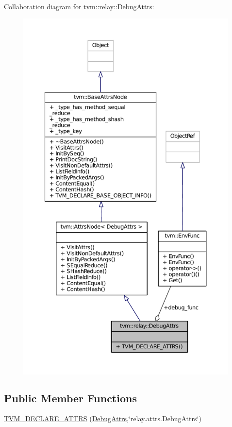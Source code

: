 Collaboration diagram for tvm\+:\+:relay\+:\+:Debug\+Attrs\+:
\nopagebreak
\begin{figure}[H]
\begin{center}
\leavevmode
\includegraphics[height=550pt]{structtvm_1_1relay_1_1DebugAttrs__coll__graph}
\end{center}
\end{figure}
\subsection*{Public Member Functions}
\begin{DoxyCompactItemize}
\item 
\hyperlink{structtvm_1_1relay_1_1DebugAttrs_ad9de58310cd2a2452f30b2e123cf56c8}{T\+V\+M\+\_\+\+D\+E\+C\+L\+A\+R\+E\+\_\+\+A\+T\+T\+RS} (\hyperlink{structtvm_1_1relay_1_1DebugAttrs}{Debug\+Attrs},\char`\"{}relay.\+attrs.\+Debug\+Attrs\char`\"{})
\end{DoxyCompactItemize}
